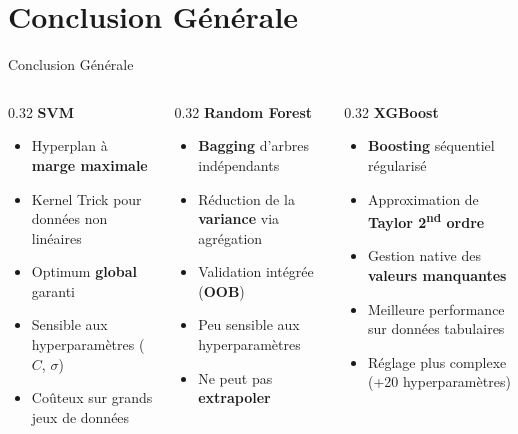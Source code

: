 \documentclass[11pt]{beamer}
\begin{document}
\section{Conclusion Générale}

\begin{frame}{Conclusion Générale}
    \small
    \begin{columns}[T]
    \begin{column}{0.32\textwidth}
        \textbf{SVM}{\small
            \begin{itemize}
                \item Hyperplan à \textbf{marge maximale}
                \item Kernel Trick pour données non linéaires
                \item Optimum \textbf{global} garanti
                \item Sensible aux hyperparamètres ($C$, $\sigma$)
                \item Coûteux sur grands jeux de données
            \end{itemize}}
    \end{column}
    \begin{column}{0.32\textwidth}
        \textbf{Random Forest}{\small
            \begin{itemize}
                \item \textbf{Bagging} d'arbres indépendants
                \item Réduction de la \textbf{variance} via agrégation
                \item Validation intégrée (\textbf{OOB})
                \item Peu sensible aux hyperparamètres
                \item Ne peut pas \textbf{extrapoler}
            \end{itemize}}
    \end{column}
    \begin{column}{0.32\textwidth}
        \textbf{XGBoost}{\small
            \begin{itemize}
                \item \textbf{Boosting} séquentiel régularisé
                \item Approximation de \textbf{Taylor 2\textsuperscript{nd} ordre}
                \item Gestion native des \textbf{valeurs manquantes}
                \item Meilleure performance sur données tabulaires
                \item Réglage plus complexe (+20 hyperparamètres)
            \end{itemize}}
    \end{column}
    \end{columns}
\end{frame}
\end{document}
